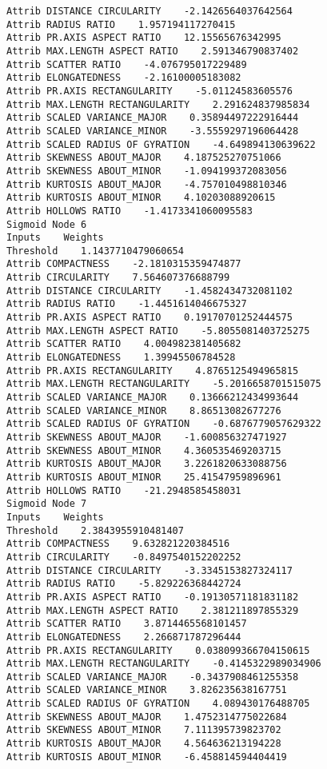 \documentclass[
	article,			%
	11pt,				%
	oneside,			%
	a4paper,			%
	english,			%
	brazil,				%
	sumario=tradicional
	]{abntex2}
\begin{document}
\begin{lstlisting}
Attrib DISTANCE CIRCULARITY    -2.1426564037642564
Attrib RADIUS RATIO    1.957194117270415
Attrib PR.AXIS ASPECT RATIO    12.15565676342995
Attrib MAX.LENGTH ASPECT RATIO    2.591346790837402
Attrib SCATTER RATIO    -4.076795017229489
Attrib ELONGATEDNESS    -2.16100005183082
Attrib PR.AXIS RECTANGULARITY    -5.01124583605576
Attrib MAX.LENGTH RECTANGULARITY    2.291624837985834
Attrib SCALED VARIANCE_MAJOR    0.35894497222916444
Attrib SCALED VARIANCE_MINOR    -3.5559297196064428
Attrib SCALED RADIUS OF GYRATION    -4.649894130639622
Attrib SKEWNESS ABOUT_MAJOR    4.187525270751066
Attrib SKEWNESS ABOUT_MINOR    -1.094199372083056
Attrib KURTOSIS ABOUT_MAJOR    -4.757010498810346
Attrib KURTOSIS ABOUT_MINOR    4.10203088920615
Attrib HOLLOWS RATIO    -1.4173341060095583
Sigmoid Node 6
Inputs    Weights
Threshold    1.1437710479060654
Attrib COMPACTNESS    -2.1810315359474877
Attrib CIRCULARITY    7.564607376688799
Attrib DISTANCE CIRCULARITY    -1.4582434732081102
Attrib RADIUS RATIO    -1.4451614046675327
Attrib PR.AXIS ASPECT RATIO    0.19170701252444575
Attrib MAX.LENGTH ASPECT RATIO    -5.8055081403725275
Attrib SCATTER RATIO    4.004982381405682
Attrib ELONGATEDNESS    1.39945506784528
Attrib PR.AXIS RECTANGULARITY    4.8765125494965815
Attrib MAX.LENGTH RECTANGULARITY    -5.2016658701515075
Attrib SCALED VARIANCE_MAJOR    0.13666212434993644
Attrib SCALED VARIANCE_MINOR    8.86513082677276
Attrib SCALED RADIUS OF GYRATION    -0.6876779057629322
Attrib SKEWNESS ABOUT_MAJOR    -1.600856327471927
Attrib SKEWNESS ABOUT_MINOR    4.360535469203715
Attrib KURTOSIS ABOUT_MAJOR    3.2261820633088756
Attrib KURTOSIS ABOUT_MINOR    25.41547959896961
Attrib HOLLOWS RATIO    -21.2948585458031
Sigmoid Node 7
Inputs    Weights
Threshold    2.3843955910481407
Attrib COMPACTNESS    9.632821220384516
Attrib CIRCULARITY    -0.8497540152202252
Attrib DISTANCE CIRCULARITY    -3.3345153827324117
Attrib RADIUS RATIO    -5.829226368442724
Attrib PR.AXIS ASPECT RATIO    -0.19130571181831182
Attrib MAX.LENGTH ASPECT RATIO    2.381211897855329
Attrib SCATTER RATIO    3.8714465568101457
Attrib ELONGATEDNESS    2.266871787296444
Attrib PR.AXIS RECTANGULARITY    0.038099366704150615
Attrib MAX.LENGTH RECTANGULARITY    -0.4145322989034906
Attrib SCALED VARIANCE_MAJOR    -0.3437908461255358
Attrib SCALED VARIANCE_MINOR    3.826235638167751
Attrib SCALED RADIUS OF GYRATION    4.089430176488705
Attrib SKEWNESS ABOUT_MAJOR    1.4752314775022684
Attrib SKEWNESS ABOUT_MINOR    7.111395739823702
Attrib KURTOSIS ABOUT_MAJOR    4.564636213194228
Attrib KURTOSIS ABOUT_MINOR    -6.458814594404419

\end{lstlisting}
\end{document}
